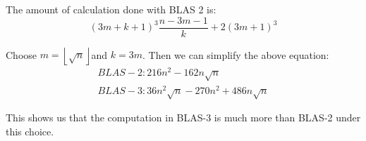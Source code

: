 The amount of calculation done with BLAS 2 is:
\[{(3m + k + 1)^3}\frac{{n - 3m - 1}}{k} + 2{(3m + 1)^3}\]

Choose \(m = \left\lfloor {\sqrt n } \right\rfloor \)and \(k = 3m\). Then we can simplify the above equation:
\[\begin{array}{l}
BLAS - 2:216{n^2} - 162n\sqrt n \\
BLAS - 3:36{n^2}\sqrt n  - 270{n^2} + 486n\sqrt n 
\end{array}\]

This shows us that the computation in BLAS-3 is much more than BLAS-2 under this choice.
